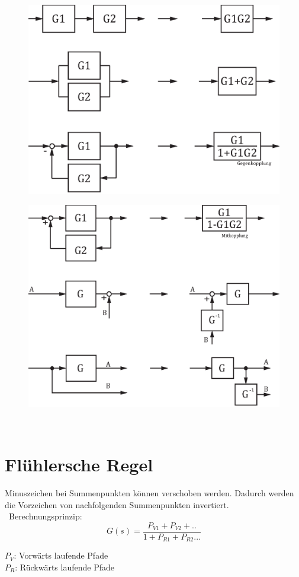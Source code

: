\begin{center}
\begin{figure}[ht]
	\includegraphics[scale = 0.62]{images/teilsysteme_p1.eps}
\end{figure}
\end{center}
\begin{center}
	\begin{figure}[ht]
	\includegraphics[scale = 0.62]{images/teilsysteme_p2.eps}
	\end{figure}
\end{center}
\
\\
\section{Flühlersche Regel}
Minuszeichen bei Summenpunkten können verschoben werden. Dadurch werden die Vorzeichen von nachfolgenden Summenpunkten invertiert.
\
Berechnungsprinzip:
\[
	G(s)=\frac{P_{V1}+P_{V2}+..}{1+P_{R1}+P_{R2}...}
\]
\begin{footnotesize}
	$P_V$:	Vorwärts laufende Pfade\\
	$P_R$:	Rückwärts laufende Pfade\\
\end{footnotesize}